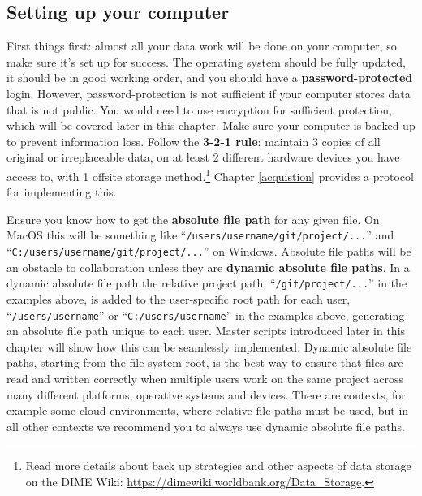 \documentclass[
]{book}
\begin{document}
\hypertarget{setting-up-your-computer}{%
\subsection*{Setting up your computer}\label{setting-up-your-computer}}

First things first:
almost all your data work will be done on your computer,
so make sure it's set up for success.
The operating system should be fully updated,
it should be in good working order,
and you should have a \textbf{password-protected} login.
However, password-protection is not sufficient
if your computer stores data that is not public.
You would need to use encryption for sufficient protection,
which will be covered later in this chapter.
Make sure your computer is backed up to prevent information loss.
Follow the \textbf{3-2-1 rule}: maintain 3 copies of all original or irreplaceable data,
on at least 2 different hardware devices you have access to,
with 1 offsite storage method.\footnote{Read more details about back up strategies
  and other aspects of data storage on the DIME Wiki:
  \url{https://dimewiki.worldbank.org/Data_Storage}.}
Chapter \ref{acquistion} provides a protocol for implementing this.

Ensure you know how to get the \textbf{absolute file path} for any given file.
On MacOS this will be something like ``\texttt{/users/username/git/project/...}''
and ``\texttt{C:/users/username/git/project/...}'' on Windows.
Absolute file paths will be an obstacle to collaboration
unless they are \textbf{dynamic absolute file paths}.
In a dynamic absolute file path the relative project path,
``\texttt{/git/project/...}'' in the examples above, is added
to the user-specific root path for each user,
``\texttt{/users/username}'' or ``\texttt{C:/users/username}'' in the examples above,
generating an absolute file path unique to each user.
Master scripts introduced later in this chapter will show
how this can be seamlessly implemented.
Dynamic absolute file paths, starting from the file system root,
is the best way to ensure that files are read and written correctly
when multiple users work on the same project
across many different platforms, operative systems and devices.
There are contexts, for example some cloud environments,
where relative file paths must be used,
but in all other contexts we recommend you
to always use dynamic absolute file paths.
\end{document}
